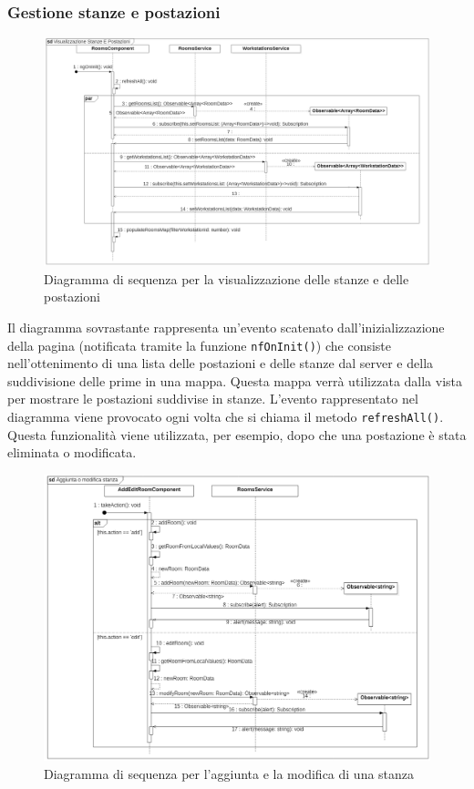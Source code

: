 \subsubsection{Gestione stanze e postazioni}
\begin{figure}[H]
	\centering
	\includegraphics[width=18cm]{res/images/webapp-visualStanzePostazioni-diagrammaSequenza.png}
	\caption{Diagramma di sequenza per la visualizzazione delle stanze e delle postazioni}
	\label{fig:DiagrammaSequenzaStanzePostazioni1}
\end{figure}
Il diagramma sovrastante rappresenta un'evento scatenato dall'inizializzazione della pagina (notificata tramite la funzione \texttt{nfOnInit()}) che consiste nell'ottenimento di una lista delle postazioni e delle stanze dal server e della suddivisione delle prime in una mappa. Questa mappa verrà utilizzata dalla vista per mostrare le postazioni suddivise in stanze. L'evento rappresentato nel diagramma viene provocato ogni volta che si chiama il metodo \texttt{refreshAll()}. Questa funzionalità viene utilizzata, per esempio, dopo che una postazione è stata eliminata o modificata.
\begin{figure}[H]
	\centering
	\includegraphics[width=18cm]{res/images/webapp-addEditStanzePostazioni-diagrammaSequenza.png}
	\caption{Diagramma di sequenza per l'aggiunta e la modifica di una stanza}
	\label{fig:DiagrammaSequenzaStanzePostazioni2}
\end{figure}
